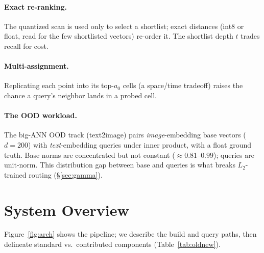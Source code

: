\documentclass{article}
\begin{document}
\paragraph{Exact re-ranking.} The quantized scan is used only to select a shortlist;
exact distances (int8 or float, read for the few shortlisted vectors) re-order it.
The shortlist depth $t$ trades recall for cost.

\paragraph{Multi-assignment.} Replicating each point into its top-$a_0$ cells (a
space/time tradeoff) raises the chance a query's neighbor lands in a probed cell.

\paragraph{The OOD workload.} The big-ANN OOD track (text2image) pairs
\emph{image}-embedding base vectors ($d{=}200$) with \emph{text}-embedding queries
under inner product, with a float ground truth. Base norms are concentrated but not
constant ($\approx0.81$--$0.99$); queries are unit-norm. This distribution gap
between base and queries is what breaks $L_2$-trained routing (\S\ref{sec:gamma}).

\section{System Overview}
\label{sec:overview}
Figure~\ref{fig:arch} shows the pipeline; we describe the build
and query paths, then delineate standard vs.\ contributed components
(Table~\ref{tab:oldnew}).
\end{document}
